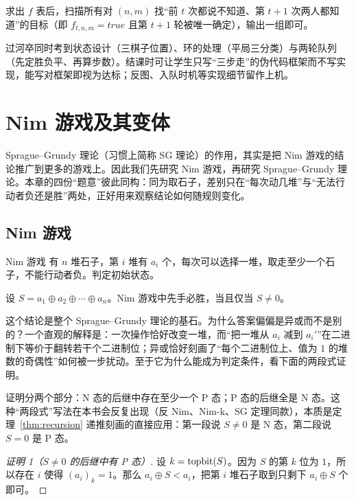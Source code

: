 求出 $f$ 表后，扫描所有对 $(n,m)$ 找“前 $t$ 次都说不知道、第 $t+1$ 次两人都知道”的目标（即 $f_{t,n,m}=true$ 且第 $t+1$ 轮被唯一确定），输出一组即可。

\begin{teach}[为何这道题适合作为状态图题的结课例]
过河卒同时考到状态设计（三棋子位置）、环的处理（平局三分类）与两轮队列（先定胜负平、再算步数）。结课时可让学生只写“三步走”的伪代码框架而不写实现，能写对框架即视为达标；反图、入队时机等实现细节留作上机。
\end{teach}
\chapter{Nim 游戏及其变体}
Sprague--Grundy 理论（习惯上简称 SG 理论）的作用，其实是把 Nim 游戏的结论推广到更多的游戏上。因此我们先研究 Nim 游戏，再研究 Sprague--Grundy 理论。本章的四份“题意”彼此同构：同为取石子，差别只在“每次动几堆”与“无法行动者负还是胜”两处，正好用来观察结论如何随规则变化。

\section{Nim 游戏}
\begin{problem}{Nim 游戏}
有 $n$ 堆石子，第 $i$ 堆有 $a_i$ 个，每次可以选择一堆，取走至少一个石子，不能行动者负。判定初始状态。
\end{problem}

\begin{theorem}[Bouton 定理]\label{thm:bouton}
设 $S=a_1\oplus a_2\oplus\cdots\oplus a_n$。Nim 游戏中先手必胜，当且仅当 $S\ne0$。
\end{theorem}

这个结论是整个 Sprague--Grundy 理论的基石。为什么答案偏偏是异或而不是别的？一个直观的解释是：一次操作恰好改变一堆，而“把一堆从 $a_i$ 减到 $a_i'$”在二进制下等价于翻转若干个二进制位；异或恰好刻画了“每个二进制位上、值为 $1$ 的堆数的奇偶性”如何被一步扰动。至于它为什么能成为判定条件，看下面的两段式证明。

证明分两个部分：N 态的后继中存在至少一个 P 态；P 态的后继全是 N 态。这种“两段式”写法在本书会反复出现（反 Nim、Nim-k、SG 定理同款），本质是定理~\ref{thm:recursion} 递推刻画的直接应用：第一段说 $S\ne0$ 是 N 态，第二段说 $S=0$ 是 P 态。

\begin{proof}[证明 1（$S\ne0$ 的后继中有 P 态）]
设 $k=\operatorname{topbit}(S)$。因为 $S$ 的第 $k$ 位为 $1$，所以存在 $i$ 使得 $(a_i)_k=1$。那么 $a_i\oplus S<a_i$，把第 $i$ 堆石子取到只剩下 $a_i\oplus S$ 个即可。
\end{proof}

